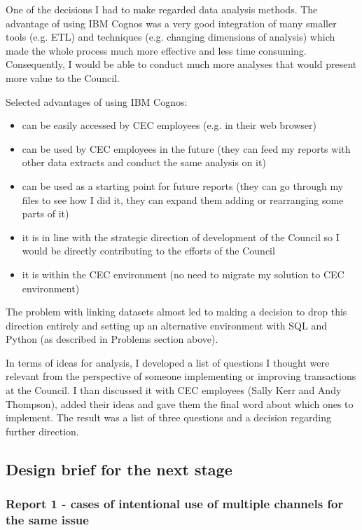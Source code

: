 One of the decisions I had to make regarded data analysis methods. The advantage of using IBM Cognos was a very good integration of many smaller tools (e.g. ETL) and techniques (e.g. changing dimensions of analysis) which made the whole process much more effective and less time consuming. Consequently, I would be able to conduct much more analyses that would present more value to the Council.

Selected advantages of using IBM Cognos:
\begin{itemize}
\item can be easily accessed by CEC employees (e.g. in their web browser)
\item can be used by CEC employees in the future (they can feed my reports with other data extracts and conduct the same analysis on it)
\item can be used as a starting point for future reports (they can go through my files to see how I did it, they can expand them adding or rearranging some parts of it)
\item it is in line with the strategic direction of development of the Council so I would be directly contributing to the efforts of the Council
\item it is within the CEC environment (no need to migrate my solution to CEC environment)
\end{itemize}

The problem with linking datasets almost led to making a decision to drop this direction entirely and setting up an alternative environment with SQL and Python (as described in Problems section above).

In terms of ideas for analysis, I developed a list of questions I thought were relevant from the perspective of someone implementing or improving transactions at the Council. I than discussed it with CEC employees (Sally Kerr and Andy Thompson), added their ideas and gave them the final word about which ones to implement. The result was a list of three questions and a decision regarding further direction.
		
		\subsection{Design brief for the next stage}
		
			\subsubsection{Report 1 - cases of intentional use of multiple channels for the same issue}
			
